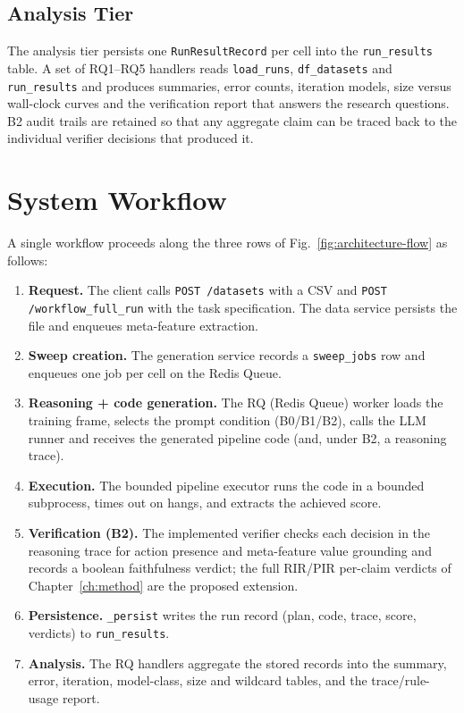 \subsection{Analysis Tier}

The analysis tier persists one \texttt{RunResultRecord} per cell into
the \texttt{run\_results} table. A set of RQ1--RQ5 handlers reads
\texttt{load\_runs}, \texttt{df\_datasets} and
\texttt{run\_results} and produces summaries, error counts, iteration models,
size versus wall-clock curves and the verification report that
answers the research questions. B2 audit trails are retained so that
any aggregate claim can be traced back to the individual verifier
decisions that produced it.

\section{System Workflow}

A single workflow proceeds along the three rows of
Fig.~\ref{fig:architecture-flow} as follows:

\begin{enumerate}
    \item \textbf{Request.} The client calls \texttt{POST
    /datasets} with a CSV and \texttt{POST /workflow\_full\_run}
    with the task specification. The data service persists the file
    and enqueues meta-feature extraction.
    \item \textbf{Sweep creation.} The generation service records a
    \texttt{sweep\_jobs} row and enqueues one job per cell on the
    Redis Queue.
    \item \textbf{Reasoning + code generation.} The RQ (Redis Queue)
    worker loads the training frame, selects the prompt condition
    (B0/B1/B2), calls the LLM runner and receives the generated
    pipeline code (and, under B2, a reasoning trace).
    \item \textbf{Execution.} The bounded pipeline executor runs the
    code in a bounded subprocess, times out on hangs, and extracts the
    achieved score.
    \item \textbf{Verification (B2).} The implemented verifier checks
    each decision in the reasoning trace for action presence and
    meta-feature value grounding and records a boolean faithfulness
    verdict; the full RIR/PIR per-claim verdicts of
    Chapter~\ref{ch:method} are the proposed extension.
    \item \textbf{Persistence.} \texttt{\_persist} writes the run
    record (plan, code, trace, score, verdicts) to
    \texttt{run\_results}.
    \item \textbf{Analysis.} The RQ handlers aggregate the stored
    records into the summary, error, iteration, model-class, size
    and wildcard tables, and the trace/rule-usage report.
\end{enumerate}

